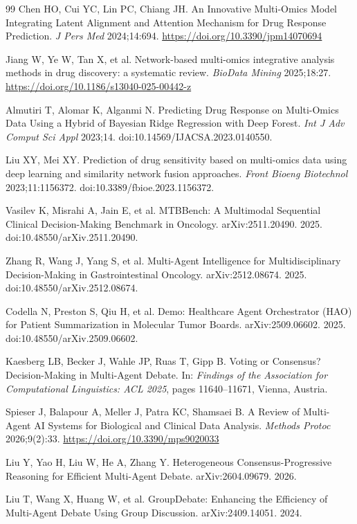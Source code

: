 \documentclass[11pt,letterpaper]{article}
\begin{document}
\begin{thebibliography}{99}
Chen HO, Cui YC, Lin PC, Chiang JH.
An Innovative Multi-Omics Model Integrating Latent Alignment and Attention Mechanism for Drug Response Prediction.
\textit{J Pers Med} 2024;14:694.
\url{https://doi.org/10.3390/jpm14070694}

Jiang W, Ye W, Tan X, et al.
Network-based multi-omics integrative analysis methods in drug discovery: a systematic review.
\textit{BioData Mining} 2025;18:27.
\url{https://doi.org/10.1186/s13040-025-00442-z}

Almutiri T, Alomar K, Alganmi N.
Predicting Drug Response on Multi-Omics Data Using a Hybrid of Bayesian Ridge Regression with Deep Forest.
\textit{Int J Adv Comput Sci Appl} 2023;14.
doi:10.14569/IJACSA.2023.0140550.

Liu XY, Mei XY.
Prediction of drug sensitivity based on multi-omics data using deep learning and similarity network fusion approaches.
\textit{Front Bioeng Biotechnol} 2023;11:1156372.
doi:10.3389/fbioe.2023.1156372.

Vasilev K, Misrahi A, Jain E, et al.
MTBBench: A Multimodal Sequential Clinical Decision-Making Benchmark in Oncology.
arXiv:2511.20490. 2025.
doi:10.48550/arXiv.2511.20490.

Zhang R, Wang J, Yang S, et al.
Multi-Agent Intelligence for Multidisciplinary Decision-Making in Gastrointestinal Oncology.
arXiv:2512.08674. 2025.
doi:10.48550/arXiv.2512.08674.

Codella N, Preston S, Qiu H, et al.
Demo: Healthcare Agent Orchestrator (HAO) for Patient Summarization in Molecular Tumor Boards.
arXiv:2509.06602. 2025.
doi:10.48550/arXiv.2509.06602.

Kaesberg LB, Becker J, Wahle JP, Ruas T, Gipp B.
Voting or Consensus? Decision-Making in Multi-Agent Debate.
In: \textit{Findings of the Association for Computational Linguistics: ACL 2025}, pages 11640--11671, Vienna, Austria.

Spieser J, Balapour A, Meller J, Patra KC, Shamsaei B.
A Review of Multi-Agent AI Systems for Biological and Clinical Data Analysis.
\textit{Methods Protoc} 2026;9(2):33.
\url{https://doi.org/10.3390/mps9020033}

Liu Y, Yao H, Liu W, He A, Zhang Y.
Heterogeneous Consensus-Progressive Reasoning for Efficient Multi-Agent Debate.
arXiv:2604.09679. 2026.

Liu T, Wang X, Huang W, et al.
GroupDebate: Enhancing the Efficiency of Multi-Agent Debate Using Group Discussion.
arXiv:2409.14051. 2024.


\end{thebibliography}
\end{document}
